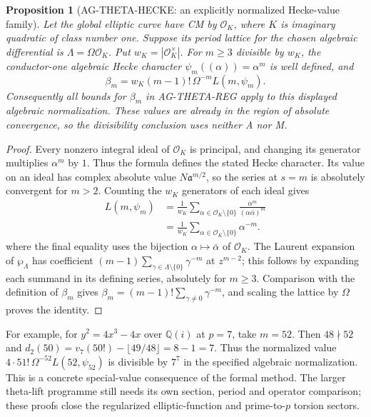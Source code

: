 \documentclass[11pt,a4paper]{article}
\newtheorem{proposition}{Proposition}
\begin{document}
\begin{proposition}[AG-THETA-HECKE: an explicitly normalized Hecke-value family]
Let the global elliptic curve have CM by $\mathcal O_K$, where
$K$ is imaginary quadratic of class number one. Suppose its
period lattice for the chosen algebraic differential is
$\Lambda=\Omega\mathcal O_K$. Put
$w_K=|\mathcal O_K^\times|$. For $m\ge3$ divisible by $w_K$,
the conductor-one algebraic Hecke character
$\psi_m((\alpha))=\alpha^m$ is well defined, and
\[
 \beta_m=w_K(m-1)!\,\Omega^{-m} L(m,\psi_m).
\]
Consequently all bounds for $\beta_m$ in AG-THETA-REG apply
to this displayed algebraic normalization. These values are
already in the region of absolute convergence, so the
divisibility conclusion uses neither A nor M.
\end{proposition}
\begin{proof}
Every nonzero integral ideal of $\mathcal O_K$ is principal,
and changing its generator multiplies $\alpha^m$ by $1$.
Thus the formula defines the stated Hecke character. Its value
on an ideal has complex absolute value $N\mathfrak a^{m/2}$,
so the series at $s=m$ is absolutely convergent for $m>2$.
Counting the $w_K$ generators of each ideal gives
\[
 \begin{aligned}
 L(m,\psi_m)&=\frac1{w_K}
   \sum_{\alpha\in\mathcal O_K\setminus\{0\}}
          \frac{\alpha^m}{(\alpha\bar\alpha)^m}\\
  &=\frac1{w_K}
   \sum_{\alpha\in\mathcal O_K\setminus\{0\}}\alpha^{-m}.
 \end{aligned}
\]
where the final equality uses the bijection
$\alpha\mapsto\bar\alpha$ of $\mathcal O_K$.
The Laurent expansion of $\wp_\Lambda$ has coefficient
$(m-1)\sum_{\gamma\in\Lambda\setminus\{0\}}\gamma^{-m}$
at $z^{m-2}$; this follows by expanding each summand in its
defining series, absolutely for $m\ge3$.
Comparison with the definition of $\beta_m$ gives
$\beta_m=(m-1)!\sum_{\gamma\ne0}\gamma^{-m}$, and scaling
the lattice by $\Omega$ proves the identity.
\end{proof}

For example, for $y^2=4x^3-4x$ over $\mathbb Q(i)$ at $p=7$,
take $m=52$. Then $48\nmid52$ and
$d_2(50)=v_7(50!)-\lfloor49/48\rfloor=8-1=7$.
Thus the normalized value
$4\cdot51!\,\Omega^{-52}L(52,\psi_{52})$ is divisible by
$7^7$ in the specified algebraic normalization. This is a
concrete special-value consequence of the formal method.
The larger theta-lift programme still needs its own section,
period and operator comparison; these proofs close the
regularized elliptic-function and prime-to-$p$ torsion sectors.
\end{document}
